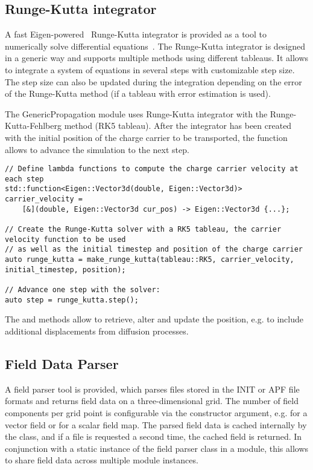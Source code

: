 \subsection{Runge-Kutta integrator}
A fast Eigen-powered~\cite{eigen3} Runge-Kutta integrator is provided as a tool to numerically solve differential equations~\cite{fehlberg}.
The Runge-Kutta integrator is designed in a generic way and supports multiple methods using different tableaus.
It allows to integrate a system of equations in several steps with customizable step size.
The step size can also be updated during the integration depending on the error of the Runge-Kutta method (if a tableau with error estimation is used).

The GenericPropagation module uses Runge-Kutta integrator with the Runge-Kutta-Fehlberg method (RK5 tableau).
After the integrator has been created with the initial position of the charge carrier to be transported, the  function allows to advance the simulation to the next step.
\begin{verbatim}
// Define lambda functions to compute the charge carrier velocity at each step
std::function<Eigen::Vector3d(double, Eigen::Vector3d)> carrier_velocity =
    [&](double, Eigen::Vector3d cur_pos) -> Eigen::Vector3d {...};

// Create the Runge-Kutta solver with a RK5 tableau, the carrier velocity function to be used
// as well as the initial timestep and position of the charge carrier
auto runge_kutta = make_runge_kutta(tableau::RK5, carrier_velocity, initial_timestep, position);

// Advance one step with the solver:
auto step = runge_kutta.step();
\end{verbatim}

The  and  methods allow to retrieve, alter and update the position, e.g. to include additional displacements from diffusion processes.

\subsection{Field Data Parser}
A field parser tool is provided, which parses files stored in the INIT or APF file formats and returns field data on a three-dimensional grid.
The number of field components per grid point is configurable via the constructor argument, e.g.  for a vector field or  for a scalar field map.
The parsed field data is cached internally by the class, and if a file is requested a second time, the cached field is returned.
In conjunction with a static instance of the field parser class in a module, this allows to share field data across multiple module instances.

